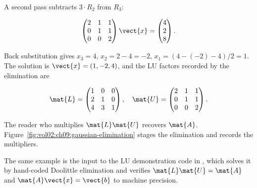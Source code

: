 A second pass subtracts $3 \cdot R_{2}$ from $R_{3}$:

\[
\begin{pmatrix} 2 & 1 & 1 \\ 0 & 1 & 1 \\ 0 & 0 & 2 \end{pmatrix}
\vect{x} = \begin{pmatrix} 4 \\ 2 \\ 8 \end{pmatrix}.
\]

Back substitution gives $x_{3} = 4$, $x_{2} = 2 - 4 = -2$, $x_{1} =
(4 - (-2) - 4)/2 = 1$. The solution is $\vect{x} = (1, -2, 4)$, and
the LU factors recorded by the elimination are

\[
\mat{L} = \begin{pmatrix} 1 & 0 & 0 \\ 2 & 1 & 0 \\ 4 & 3 & 1
\end{pmatrix}, \quad
\mat{U} = \begin{pmatrix} 2 & 1 & 1 \\ 0 & 1 & 1 \\ 0 & 0 & 2
\end{pmatrix}.
\]

The reader who multiplies $\mat{L}\mat{U}$ recovers $\mat{A}$.
Figure~\ref{fig:vol02:ch09:gaussian-elimination} stages the
elimination and records the multipliers.



The same example is the input to the LU demonstration code in
, which solves it by hand-coded Doolittle
elimination and verifies $\mat{L}\mat{U} = \mat{A}$ and
$\mat{A}\vect{x} = \vect{b}$ to machine precision.

